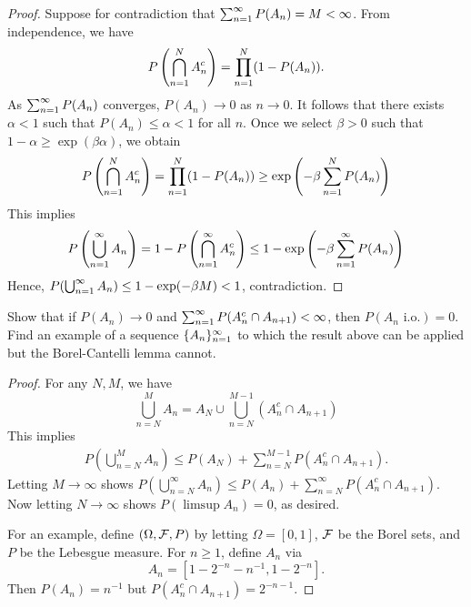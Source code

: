 \documentclass[a4paper]{article}
\begin{document}
\begin{proof}
  Suppose for contradiction that $\sum_{n=1}^\infty P(A_n) = M < \infty$. 
  From independence, we have 
  \begin{align*}
    P \left( \bigcap_{n=1}^N A_n^c \right) 
    = \prod_{n=1}^N (1 - P(A_n)).
  \end{align*}
  As $\sum_{n=1}^\infty P(A_n)$ converges, $P(A_n) \to 0$ as $n \to 0$. 
  It follows that there exists $\alpha < 1$ 
  such that $P(A_n) \leq \alpha < 1$ for all $n$. 
  Once we select $\beta > 0$ such that $1 - \alpha \geq \exp (\beta \alpha)$,
  we obtain 
  \begin{align*}
    P \left( \bigcap_{n=1}^N A_n^c \right) 
    = \prod_{n=1}^N (1 - P(A_n))
    \geq \exp \left( - \beta \sum_{n=1}^N P(A_n) \right)
  \end{align*}
  This implies 
  \begin{align*}
    P \left( \bigcup_{n=1}^\infty A_n \right)
    = 1 - P \left( \bigcap_{n=1}^\infty A_n^c \right)
    \leq 1 - \exp \left( - \beta \sum_{n=1}^\infty P(A_n) \right)
  \end{align*}
  Hence, $P (\bigcup_{n=1}^\infty A_n) \leq 1 - \exp (- \beta M) < 1$, contradiction.

\end{proof}

\begin{ex}[Durrett 2.3.9]
  Show that if $P (A_n) \to 0$ and $\sum_{n=1}^\infty P (A_n^c \cap A_{n + 1}) < \infty$,
  then $P (A_n \text{ i.o.}) = 0$. Find an example of a sequence 
  $\{ A_n \}_{n=1}^\infty$ to which the result above can
  be applied but the Borel-Cantelli lemma cannot.
\end{ex}

\begin{proof}
  For any $N, M$, we have 
  \[
  \bigcup_{n = N}^M A_n 
  = A_N \cup \bigcup_{n = N}^{M - 1} (A_n^c \cap A_{n + 1})
  \]
  This implies 
  \begin{align*}
    P \left( \bigcup_{n = N}^M A_n \right) 
    \leq P (A_N) + \sum_{n = N}^{M - 1} P (A_n^c \cap A_{n + 1}).
  \end{align*}
  Letting $M \to \infty$ shows
  $P (\bigcup_{n = N}^\infty A_n) \leq P(A_n) + \sum_{n = N}^\infty 
  P (A_n^c \cap A_{n + 1})$. 
  Now letting $N \to \infty$ shows $P (\limsup A_n) = 0$, as desired.
  
  For an example, define $(\Omega, \mathcal{F}, P)$ by letting $\Omega = [0, 1]$,
  $\mathcal{F}$ be the Borel sets, and $P$ be the Lebesgue measure. 
  For $n \geq 1$, define $A_n$ via 
  \[
  A_n = \left[ 1 - 2^{-n} - n^{-1} , 1 - 2^{-n} \right].
  \]
  Then $P(A_n) = n^{-1}$ but $P(A_n^c \cap A_{n + 1}) = 2^{-n - 1}$.


\end{proof}
\end{document}

